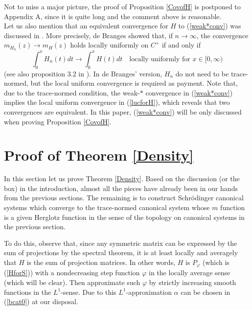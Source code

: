 \documentclass[preprint,12pt]{elsarticle}
\begin{document}
 Not to miss a major picture, the proof of Proposition \ref{CovofH} is postponed to Appendix A, since it is quite long and the comment above is reasonable.\\

Let us also mention that an equivalent convergence for $H$ to (\ref{weak*conv}) was discussed in \cite{deB2}. More precisely, de Branges showed that, if $n\to\infty$, the convergence $m_{H_n}(z)\to m_{H}(z)$ holds locally uniformly on $C^+$ if and only if 
\begin{equation}\label{lucforH}
\int_0^x H_n(t) dt \to \int_0^x H(t)dt \quad \textrm{locally uniformly for } x\in [0,\infty)
\end{equation}
(see also proposition 3.2 in \cite{L&W}). In de Branges' version, $H_n$ do not need to be trace-normed, but the local uniform convergence is required as payment. Note that, due to the trace-normed condition, the weak-$\ast$ convergence in (\ref{weak*conv}) implies the local uniform convergence in (\ref{lucforH}), which reveals that two convergences are equivalent. In this paper, (\ref{weak*conv}) will be only discussed when proving Proposition \ref{CovofH}.\\ 

\section{Proof of Theorem \ref{Density}}\label{secpf}
In this section let us prove Theorem \ref{Density}. Based on the discussion (or the box) in the introduction, almost all the pieces have already been in our hands from the previous sections. The remaining is to construct Schr\"odinger canonical systems which converge to the trace-normed canonical system whose $m$ function is a given Herglotz function in the sense of the topology on canonical systems in the previous section.

To do this, observe that, since any symmetric matrix can be expressed by the sum of projections by the spectral theorem, it is at least locally and averagely  that $H$ is the sum of projection matrices. In other words, $H$ is $P_{\varphi}$ (which is (\ref{HforS})) with a nondecreasing step function $\varphi$ in the locally average sense (which will be clear). Then approximate such $\varphi$ by strictly increasing smooth functions in the $L^1$-sense. Due to this $L^1$-approximation $\alpha$ can be chosen  in (\ref{bcat0}) at our disposal. 
\end{document}
